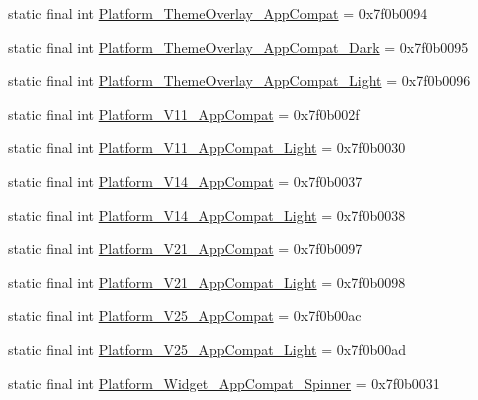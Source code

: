 \begin{CompactItemize}
static final int \hyperlink{classandroid_1_1support_1_1graphics_1_1drawable_1_1_r_1_1style_49d9db63913d2c7b7f3b32df1c66779a}{Platform\_\-ThemeOverlay\_\-AppCompat} = 0x7f0b0094
\item 
static final int \hyperlink{classandroid_1_1support_1_1graphics_1_1drawable_1_1_r_1_1style_b359e0e21679f3833e9fe5422d681c4a}{Platform\_\-ThemeOverlay\_\-AppCompat\_\-Dark} = 0x7f0b0095
\item 
static final int \hyperlink{classandroid_1_1support_1_1graphics_1_1drawable_1_1_r_1_1style_bfbe08c1ad17ab7448b3867998aae5fe}{Platform\_\-ThemeOverlay\_\-AppCompat\_\-Light} = 0x7f0b0096
\item 
static final int \hyperlink{classandroid_1_1support_1_1graphics_1_1drawable_1_1_r_1_1style_87a443a2239f080aad93243a6270b2f3}{Platform\_\-V11\_\-AppCompat} = 0x7f0b002f
\item 
static final int \hyperlink{classandroid_1_1support_1_1graphics_1_1drawable_1_1_r_1_1style_06e64654ad358237068e1679156d2a7e}{Platform\_\-V11\_\-AppCompat\_\-Light} = 0x7f0b0030
\item 
static final int \hyperlink{classandroid_1_1support_1_1graphics_1_1drawable_1_1_r_1_1style_bcb77084202b7a6e7bc5a9cf4e5c88a8}{Platform\_\-V14\_\-AppCompat} = 0x7f0b0037
\item 
static final int \hyperlink{classandroid_1_1support_1_1graphics_1_1drawable_1_1_r_1_1style_0ed99f10dfbc2efbf15cd74a45beadd9}{Platform\_\-V14\_\-AppCompat\_\-Light} = 0x7f0b0038
\item 
static final int \hyperlink{classandroid_1_1support_1_1graphics_1_1drawable_1_1_r_1_1style_76ef64fd33a1172abe4569b80283e518}{Platform\_\-V21\_\-AppCompat} = 0x7f0b0097
\item 
static final int \hyperlink{classandroid_1_1support_1_1graphics_1_1drawable_1_1_r_1_1style_29a83c02ad867caba21a7a04a6eafa17}{Platform\_\-V21\_\-AppCompat\_\-Light} = 0x7f0b0098
\item 
static final int \hyperlink{classandroid_1_1support_1_1graphics_1_1drawable_1_1_r_1_1style_0ad065761d4526623433b86b50f6d0da}{Platform\_\-V25\_\-AppCompat} = 0x7f0b00ac
\item 
static final int \hyperlink{classandroid_1_1support_1_1graphics_1_1drawable_1_1_r_1_1style_5df73c1f75b4e1168d6e4320f5474740}{Platform\_\-V25\_\-AppCompat\_\-Light} = 0x7f0b00ad
\item 
static final int \hyperlink{classandroid_1_1support_1_1graphics_1_1drawable_1_1_r_1_1style_990fcfd7111025abe5ec9dff3d11ec70}{Platform\_\-Widget\_\-AppCompat\_\-Spinner} = 0x7f0b0031

\end{CompactItemize}
